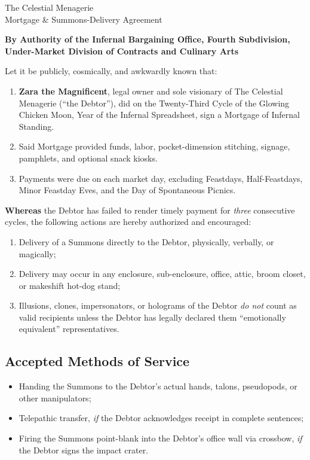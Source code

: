 \begin{tcolorbox}[title={\centering \textbf{Celestial Menagerie -- Infernal Mortgage Contract}},colback=white,colframe=black!60]
\begin{center}
{\Large The Celestial Menagerie \\
Mortgage \& Summons-Delivery Agreement}
\end{center}

\noindent
\textbf{By Authority of the Infernal Bargaining Office, Fourth Subdivision, Under-Market Division of Contracts and Culinary Arts}

\vspace{0.2cm}

\noindent
Let it be publicly, cosmically, and awkwardly known that:

\begin{enumerate}
  \item \textbf{Zara the Magnificent}, legal owner and sole visionary of The Celestial Menagerie (``the Debtor''), did on the Twenty-Third Cycle of the Glowing Chicken Moon, Year of the Infernal Spreadsheet, sign a Mortgage of Infernal Standing.
  \item Said Mortgage provided funds, labor, pocket-dimension stitching, signage, pamphlets, and optional snack kiosks.
  \item Payments were due on each market day, excluding Feastdays, Half-Feastdays, Minor Feastday Eves, and the Day of Spontaneous Picnics.
\end{enumerate}

\noindent
\textbf{Whereas} the Debtor has failed to render timely payment for \textit{three} consecutive cycles, the following actions are hereby authorized and encouraged:

\begin{enumerate}[label=\Alph*.]
  \item Delivery of a Summons directly to the Debtor, physically, verbally, or magically;
  \item Delivery may occur in any enclosure, sub-enclosure, office, attic, broom closet, or makeshift hot-dog stand;
  \item Illusions, clones, impersonators, or holograms of the Debtor \textit{do not} count as valid recipients unless the Debtor has legally declared them ``emotionally equivalent'' representatives.
\end{enumerate}

\subsection*{Accepted Methods of Service}
\begin{itemize}
  \item Handing the Summons to the Debtor's actual hands, talons, pseudopods, or other manipulators;
  \item Telepathic transfer, \emph{if} the Debtor acknowledges receipt in complete sentences;
  \item Firing the Summons point-blank into the Debtor's office wall via crossbow, \textit{if} the Debtor signs the impact crater.
\end{itemize}


\end{tcolorbox}
